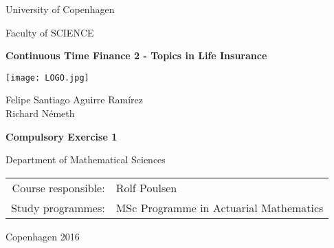 \documentclass[a4paper]{article}
\begin{document}
\begin{center}


{\large University of Copenhagen}

\medskip
{\large Faculty of SCIENCE}

\vfill
{\bfseries\Large Continuous Time Finance 2 - Topics in Life Insurance}

\vfill
\centerline{\mbox{\texttt{[image: LOGO.jpg]}}}

\vfill
\vspace{5mm}

{\LARGE Felipe Santiago Aguirre Ram\'{i}rez}\\
{\LARGE Richard Németh}\\

\vspace{15mm}

{\LARGE\bfseries Compulsory Exercise 1}

\vfill

Department of Mathematical Sciences


\vfill

\begin{tabular}{rl}
Course responsible: & Rolf Poulsen \\   %
\noalign{\vspace{2mm}}
Study programmes: & MSc Programme in Actuarial Mathematics
\end{tabular}

\vfill

Copenhagen 2016
\newpage

\end{center}
\newpage
{}
\end{document}
